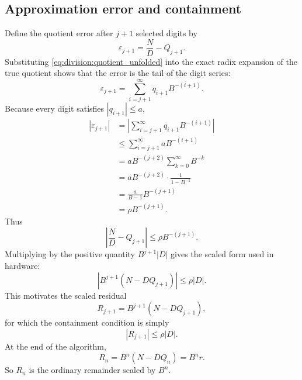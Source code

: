 \documentclass[11pt]{article}
\numberwithin{equation}{section}
\begin{document}
\subsection{Approximation error and containment}
\label{ssec:division:error_and_containment}

Define the quotient error after $j+1$ selected digits by
\begin{equation}
  \label{eq:division:error_def}
  \varepsilon_{j+1} = \frac{N}{D} - Q_{j+1}.
\end{equation}
Substituting \cref{eq:division:quotient_unfolded} into the exact radix expansion of the true
quotient shows that the error is the tail of the digit series:
\begin{equation}
  \label{eq:division:error_tail}
  \varepsilon_{j+1} = \sum_{i=j+1}^{\infty} q_{i+1}B^{-(i+1)}.
\end{equation}
Because every digit satisfies $|q_{i+1}| \le a$,
\begin{align}
  \left|\varepsilon_{j+1}\right|
  &= \left|\sum_{i=j+1}^{\infty} q_{i+1}B^{-(i+1)}\right| \nonumber \\
  &\le \sum_{i=j+1}^{\infty} a B^{-(i+1)} \nonumber \\
  &= a B^{-(j+2)} \sum_{k=0}^{\infty} B^{-k} \nonumber \\
  &= a B^{-(j+2)} \cdot \frac{1}{1-B^{-1}} \nonumber \\
  &= \frac{a}{B-1} B^{-(j+1)} \nonumber \\
  &= \rho B^{-(j+1)}.
  \label{eq:division:error_bound}
\end{align}
Thus
\begin{equation}
  \label{eq:division:error_bound_simple}
  \left|\frac{N}{D}-Q_{j+1}\right| \le \rho B^{-(j+1)}.
\end{equation}
Multiplying by the positive quantity $B^{j+1}|D|$ gives the scaled form used in hardware:
\begin{equation}
  \label{eq:division:scaled_error_bound}
  \left|B^{j+1}(N-DQ_{j+1})\right| \le \rho |D|.
\end{equation}
This motivates the scaled residual
\begin{equation}
  \label{eq:division:residual_def}
  R_{j+1} = B^{j+1}(N-DQ_{j+1}),
\end{equation}
for which the containment condition is simply
\begin{equation}
  \label{eq:division:containment}
  |R_{j+1}| \le \rho |D|.
\end{equation}
At the end of the algorithm,
\begin{equation}
  \label{eq:division:final_remainder}
  R_n = B^n(N-DQ_n) = B^n r.
\end{equation}
So $R_n$ is the ordinary remainder scaled by $B^n$.
\end{document}
